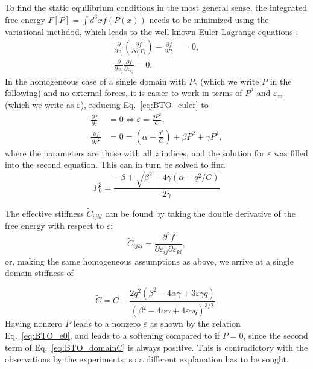 To find the static equilibrium conditions in the most general sense, the integrated free energy $F[P] = \int d^3x f(P(x))$ needs to be minimized using the variational methdod, which leads to the well known Euler-Lagrange equations \cite{Cao1991, Marton2010}:
\begin{align}
	\label{eq:BTO_euler}
	\frac{\partial}{\partial x_j}\left( \frac{\partial f}{\partial \partial_j P_i}\right) - \frac{\partial f}{\partial P_i} &= 0, \\
	\frac{\partial}{\partial x_j}\frac{\partial f}{\partial \varepsilon_{ij}} = 0.
\end{align}
In the homogeneous case of a single domain with $P_z$ (which we write $P$ in the following) and no external forces, it is easier to work in terms of $P^2$ and $\varepsilon_{zz}$ (which we write as $\varepsilon$), reducing Eq.~\ref{eq:BTO_euler} to  
\begin{align}
	\frac{\partial f}{\partial \varepsilon} &= 0 \Leftrightarrow \varepsilon = \frac{qP^2}{C}\label{eq:BTO_e0},\\
	\frac{\partial f}{\partial P^2} &= 0 = \left(\alpha - \frac{q^2}{C}\right) + \beta P^2 + \gamma P^4,
\end{align}
where the parameters are those with all $z$ indices, and the solution for $\varepsilon$ was filled into the second equation. This can in turn be solved to find
\begin{equation}
	P_0^2 = \frac{-\beta + \sqrt{\beta^2 - 4\gamma (\alpha - q^2/C)}}{2\gamma}
\end{equation}

The effective stiffness $\tilde{C}_{ijkl}$ can be found by taking the double derivative of the free energy with respect to $\varepsilon$:
\begin{equation}
	\tilde{C}_{ijkl} = \frac{\partial^2 f}{\partial \varepsilon_{ij} \partial \varepsilon_{kl}},
\end{equation}
or, making the same homogeneous assumptions as above, we arrive at a single domain stiffness of

\begin{equation}
	\tilde{C} = C - \frac{2q^2\left(\beta^2-4\alpha\gamma + 3 \varepsilon \gamma q\right)}{\left(\beta^2 - 4 \alpha \gamma + 4 \varepsilon \gamma q\right)^{3/2}}\label{eq:BTO_domainC}.
\end{equation}
Having nonzero $P$ leads to a nonzero $\varepsilon$ as shown by the relation Eq.~\ref{eq:BTO_e0}, and leads to a softening compared to if $P=0$, since the second term of Eq.~\ref{eq:BTO_domainC} is always positive.
This is contradictory with the observations by the experiments, so a different explanation has to be sought.

